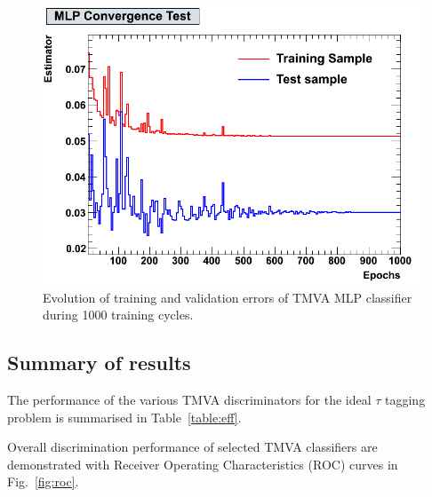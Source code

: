 \documentclass[a4paper]{jpconf}
\begin{document}
\begin{figure}[h]
 \begin{minipage}{8.5cm}
\includegraphics[width=1.0\textwidth]{images/MLPConvergenceTest.png}
\end{minipage}
\begin{minipage}{9.0cm}
\end{minipage}
\begin{minipage}{7.0cm}
\caption{Evolution of training and validation errors of TMVA MLP classifier during 1000 training cycles.}
\end{minipage}
\label{fig:nn}
\end{figure}

\subsection{Summary of results}
The performance of the various TMVA discriminators for the ideal $\tau$ tagging problem
is summarised in Table~\ref{table:eff}.

Overall discrimination performance of selected TMVA classifiers are
demonstrated with Receiver Operating Characteristics (ROC) curves in
Fig.~\ref{fig:roc}.
\end{document}
